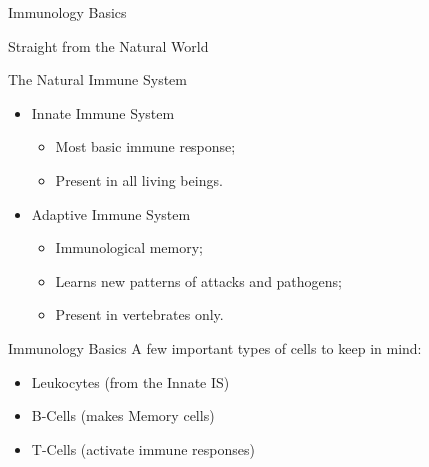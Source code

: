 \documentclass[xcolor=svgnames]{beamer}
\newcommand{\introframe}[2]{
    \begin{frame}
       \vfill
       \hfill\Huge{#1}
       
       \vspace{1em}
       
       \hfill\Large{#2}
       \vfill
    \end{frame}
}
\begin{document}
    \introframe{Immunology Basics}{Straight from the Natural World}
    
        \begin{frame}{The Natural Immune System}        
            \begin{itemize}
                \item Innate Immune System
                \begin{itemize}
                    \item Most basic immune response;
                    \item Present in all living beings.
                \end{itemize}
                \item Adaptive Immune System
                \begin{itemize}
                    \item Immunological memory;
                    \item Learns new patterns of attacks and pathogens;
                    \item Present in vertebrates only.
                \end{itemize}
            \end{itemize}
        \end{frame}
        
        \begin{frame}{Immunology Basics}
            A few important types of cells to keep in mind:
            \vspace{1em}
            \begin{itemize}
                \item Leukocytes (from the Innate IS)
                \item B-Cells (makes Memory cells)
                \item T-Cells (activate immune responses)
            \end{itemize}
        \end{frame}
\end{document}
